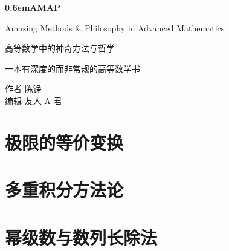 \documentclass{ctexbook}
\begin{document}
\clearpage
\newcommand\nbvspace[1][3]{\vspace*{\stretch{#1}}}
\newcommand\nbstretchyspace{\spaceskip0.5em plus 0.25em minus 0.25em}
\newcommand{\nbtitlestretch}{\spaceskip0.6em}
\pagestyle{empty}
\begin{center}
\bfseries
\nbvspace[1]
\Huge
{\nbtitlestretch\huge AMAP}

\nbvspace[1]
\normalsize

Amazing Methods \& Philosophy in Advanced Mathematics

\Large 高等数学中的神奇方法与哲学

\nbvspace[2]

\normalsize 一本有深度的而非常规的高等数学书

\nbvspace[1]
\small 作者 \Large 陈铮\\[0.5em]
\small 编辑 {\large 友人 A 君}
\normalsize


\end{center}

\tableofcontents

\chapter{极限的等价变换}





\chapter{多重积分方法论}

\chapter{幂级数与数列长除法}
\end{document}
